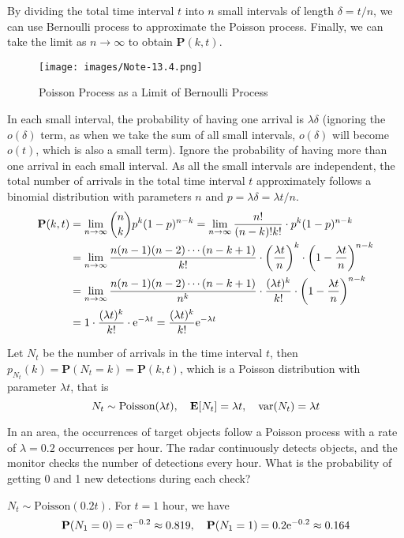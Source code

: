 \documentclass[device=normal, lang=en]{elegantbook}
\numberwithin{equation}{section}
\begin{document}
By dividing the total time interval $t$ into $n$ small intervals of length $\delta = t/n$, we can use Bernoulli process to approximate the Poisson process. Finally, we can take the limit as $n \to \infty$ to obtain $\mathbf{P}(k, t)$.
\begin{figure}[H]
    \centering
    \texttt{[image: images/Note-13.4.png]}
    \caption{Poisson Process as a Limit of Bernoulli Process}
\end{figure}

In each small interval, the probability of having one arrival is $\lambda \delta$ (ignoring the $o(\delta)$ term, as when we take the sum of all small intervals, $o(\delta)$ will become $o(t)$, which is also a small term). Ignore the probability of having more than one arrival in each small interval.
As all the small intervals are independent, the total number of arrivals in the total time interval $t$ approximately follows a binomial distribution with parameters $n$ and $p = \lambda \delta = \lambda t/n$. 
\begin{equation}
\begin{aligned}
    \mathbf{P}(k, t) &= \lim_{n \to \infty} \binom{n}{k} p^k (1-p)^{n-k} = \lim_{n \to \infty} \frac{n!}{(n-k)! k!} \cdot p^k (1-p)^{n-k} \\
    &= \lim_{n \to \infty} \frac{n(n-1)(n-2)\cdots(n-k+1)}{k!} \cdot \qty(\frac{\lambda t}{n})^k \cdot \qty(1 - \frac{\lambda t}{n})^{n-k} \\
    &= \lim_{n \to \infty} \frac{n(n-1)(n-2)\cdots(n-k+1)}{n^k} \cdot \frac{(\lambda t)^k}{k!} \cdot \qty(1 - \frac{\lambda t}{n})^{n-k} \\\
    &= 1 \cdot \frac{(\lambda t)^k}{k!} \cdot \mathrm{e}^{-\lambda t} = \frac{(\lambda t)^k}{k!} \mathrm{e}^{-\lambda t}
\end{aligned}
\end{equation}

Let $N_t$ be the number of arrivals in the time interval $t$, then $p_{N_t}(k) = \mathbf{P}(N_t = k) = \mathbf{P}(k, t)$, which is a Poisson distribution with parameter $\lambda t$, that is
\begin{equation}
    N_t \sim \text{Poisson}(\lambda t), \quad \mathbf{E}[N_t] = \lambda t, \quad \mathrm{var}(N_t) = \lambda t
\end{equation}
\begin{example}
    In an area, the occurrences of target objects follow a Poisson process with a rate of $\lambda = 0.2$ occurrences per hour. The radar continuously detects objects, and the monitor checks the number of detections every hour. What is the probability of getting 0 and 1 new detections during each check?
\end{example}
\begin{solution}
    $N_t \sim \text{Poisson}(0.2t)$. For $t = 1$ hour, we have
    \begin{equation}
        \mathbf{P}(N_1 = 0) = \mathrm{e}^{-0.2} \approx 0.819, \quad \mathbf{P}(N_1 = 1) = 0.2 \mathrm{e}^{-0.2} \approx 0.164
    \end{equation}
\end{solution}
\end{document}
